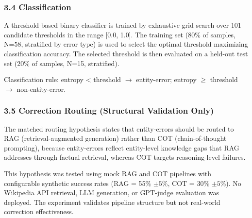 \subsubsection{3.4 Classification}

A threshold-based binary classifier is trained by exhaustive grid search over 101 candidate thresholds in the range [0.0, 1.0]. The training set (80\% of samples, N=58, stratified by error type) is used to select the optimal threshold maximizing classification accuracy. The selected threshold is then evaluated on a held-out test set (20\% of samples, N=15, stratified).

Classification rule: entropy < threshold $\rightarrow$ entity-error; entropy $\geq$ threshold $\rightarrow$ non-entity-error.

\subsubsection{3.5 Correction Routing (Structural Validation Only)}

The matched routing hypothesis states that entity-errors should be routed to RAG (retrieval-augmented generation) rather than COT (chain-of-thought prompting), because entity-errors reflect entity-level knowledge gaps that RAG addresses through factual retrieval, whereas COT targets reasoning-level failures.

This hypothesis was tested using mock RAG and COT pipelines with configurable synthetic success rates (RAG = 55\% $\pm 5$\%, COT = 30\% $\pm 5$\%). No Wikipedia API retrieval, LLM generation, or GPT-judge evaluation was deployed. The experiment validates pipeline structure but not real-world correction effectiveness.
